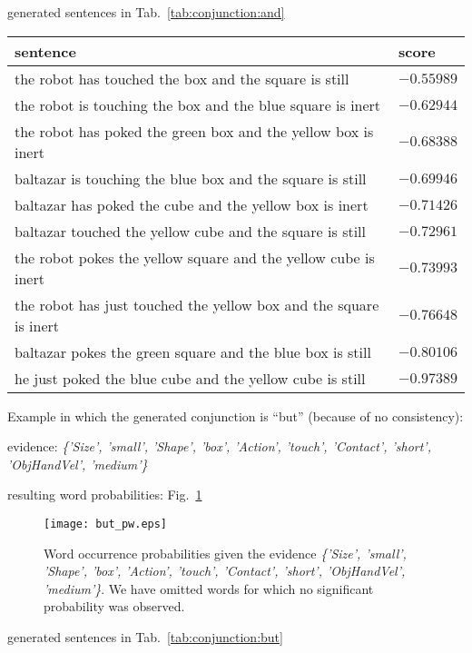 generated sentences in Tab.~\ref{tab:conjunction:and}

\begin{table*}
    \centering
    \caption{.}
    \label{tab:conjunction:and}
    \begin{tabular}{ll}
    \toprule
    sentence & score \\
    \midrule
    the robot has touched the box and the square is still & $-0.55989$ \\
    the robot is touching the box and the blue square is inert & $-0.62944$ \\
    the robot has poked the green box and the yellow box is inert & $-0.68388$ \\
    baltazar is touching the blue box and the square is still & $-0.69946$ \\
    baltazar has poked the cube and the yellow box is inert & $-0.71426$ \\
    baltazar touched the yellow cube and the square is still & $-0.72961$ \\
    the robot pokes the yellow square and the yellow cube is inert & $-0.73993$ \\
    the robot has just touched the yellow box and the square is inert & $-0.76648$ \\
    baltazar pokes the green square and the blue box is still & $-0.80106$ \\
    he just poked the blue cube and the yellow cube is still & $-0.97389$ \\
    \bottomrule
    \end{tabular}
\end{table*}

Example in which the generated conjunction is ``but'' (because of no consistency):

evidence: \emph{\{'Size', 'small', 'Shape', 'box', 'Action', 'touch', 'Contact', 'short', 'ObjHandVel', 'medium'\}}

resulting word probabilities: Fig.~\ref{fig:conjunction_but:pw}

\begin{figure}
\centering
\texttt{[image: but\_pw.eps]}
\caption{Word occurrence probabilities given the evidence \emph{\{'Size', 'small', 'Shape', 'box', 'Action', 'touch', 'Contact', 'short', 'ObjHandVel', 'medium'\}}. We have omitted words for which no significant probability was observed.}
\label{fig:conjunction_but:pw}
\end{figure}

generated sentences in Tab.~\ref{tab:conjunction:but}

